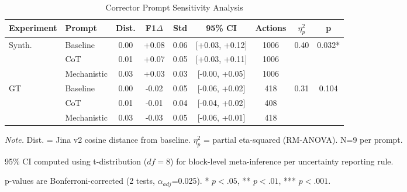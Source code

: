 \begin{table}[H]
\centering
\footnotesize
\caption{Corrector Prompt Sensitivity Analysis}
\label{tab:corrector_sensitivity}
\begin{threeparttable}
\begin{tabular}{@{}llccccccc@{}}
\toprule
\textbf{Experiment} & \textbf{Prompt} & \textbf{Dist.} & \textbf{F1$\Delta$} & \textbf{Std} & \textbf{95\% CI} & \textbf{Actions} & \textbf{$\eta^2_p$} & \textbf{p} \\
\midrule
Synth. & Baseline & 0.00 & +0.08 & 0.06 & [+0.03, +0.12] & 1006 & \multirow{3}{*}{0.40} & \multirow{3}{*}{0.032*} \\
 & CoT & 0.01 & +0.07 & 0.05 & [+0.03, +0.11] & 1006 &  &  \\
 & Mechanistic & 0.03 & +0.03 & 0.03 & [-0.00, +0.05] & 1006 &  &  \\
\midrule
GT & Baseline & 0.00 & -0.02 & 0.05 & [-0.06, +0.02] & 418 & \multirow{3}{*}{0.31} & \multirow{3}{*}{0.104} \\
 & CoT & 0.01 & -0.01 & 0.04 & [-0.04, +0.02] & 408 &  &  \\
 & Mechanistic & 0.03 & -0.03 & 0.05 & [-0.06, +0.01] & 418 &  &  \\
\bottomrule
\end{tabular}
\begin{tablenotes}
\scriptsize
\item \textit{Note.} Dist. = Jina v2 cosine distance from baseline. $\eta^2_p$ = partial eta-squared (RM-ANOVA). N=9 per prompt.
\item 95\% CI computed using t-distribution ($df=8$) for block-level meta-inference per uncertainty reporting rule.
\item p-values are Bonferroni-corrected (2 tests, $\alpha_{adj}$=0.025). * $p<.05$, ** $p<.01$, *** $p<.001$.
\end{tablenotes}
\end{threeparttable}
\end{table}